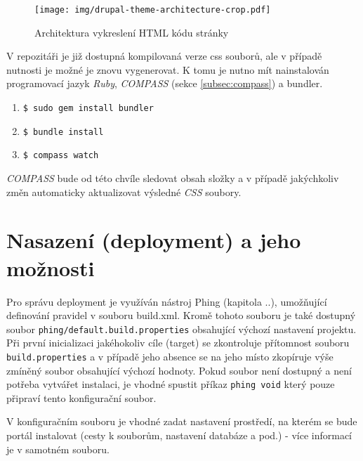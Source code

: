 \begin{figure}[]
  \texttt{[image: img/drupal-theme-architecture-crop.pdf]}
  \caption{Architektura vykreslení HTML kódu stránky}
  \label{fig:theme_architecture}
\end{figure}  

V repozitáři je již dostupná kompilovaná verze \gls{css} souborů, ale v případě nutnosti je možné je znovu vygenerovat. K tomu je nutno mít nainstalován programovací jazyk \emph{Ruby}, \emph{COMPASS} (sekce \ref{subsec:compass}) a \gls{bundler}.

\begin{enumerate}
  \item \texttt{\$ sudo gem install bundler}
  \item \texttt{\$ bundle install}
  \item \texttt{\$ compass watch}
\end{enumerate}

\emph{COMPASS} bude od této chvíle sledovat obsah složky a v případě jakýchkoliv změn automaticky aktualizovat výsledné \emph{CSS} soubory.

\section{Nasazení (deployment) a jeho možnosti}

Pro správu \gls{deployment} je využíván nástroj Phing (kapitola ..), umožňující definování pravidel v souboru build.xml. Kromě tohoto souboru je také dostupný soubor \linebreak \texttt{phing/\-default.build.properties} obsahující výchozí nastavení projektu. Při první inicializaci jakéhokoliv cíle (target) se zkontroluje přítomnost souboru \linebreak \texttt{build.properties} a v případě jeho absence se na jeho místo zkopíruje výše zmíněný soubor obsahující výchozí hodnoty. Pokud soubor není dostupný a není potřeba vytvářet instalaci, je vhodné spustit příkaz \texttt{phing void} který pouze připraví tento konfigurační soubor. 

V konfiguračním souboru je vhodné zadat nastavení prostředí, na kterém se bude portál instalovat (cesty k souborům, nastavení databáze a pod.) - více informací je v samotném souboru.

